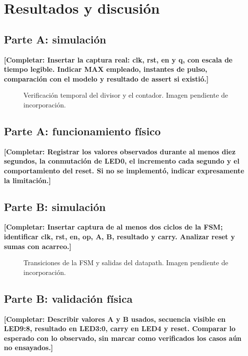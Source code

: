 \documentclass[conference]{IEEEtran}
\newcommand{\completar}[1]{\textcolor{pendiente}{\textbf{[Completar: #1]}}}
\begin{document}
\section{Resultados y discusión}
\subsection{Parte A: simulación}
\completar{Insertar la captura real: clk, rst, en y q, con escala de tiempo legible. Indicar MAX empleado, instantes de pulso, comparación con el modelo y resultado de assert si existió.}
\begin{figure}[!t]\centering
{}
\caption{Verificación temporal del divisor y el contador. Imagen pendiente de incorporación.}\label{fig:simA}
\end{figure}

\subsection{Parte A: funcionamiento físico}
\completar{Registrar los valores observados durante al menos diez segundos, la conmutación de LED0, el incremento cada segundo y el comportamiento del reset. Si no se implementó, indicar expresamente la limitación.}

\subsection{Parte B: simulación}
\completar{Insertar captura de al menos dos ciclos de la FSM; identificar clk, rst, en, op, A, B, resultado y carry. Analizar reset y sumas con acarreo.}
\begin{figure}[!t]\centering
{}
\caption{Transiciones de la FSM y salidas del datapath. Imagen pendiente de incorporación.}\label{fig:simB}
\end{figure}

\subsection{Parte B: validación física}
\completar{Describir valores A y B usados, secuencia visible en LED9:8, resultado en LED3:0, carry en LED4 y reset. Comparar lo esperado con lo observado, sin marcar como verificados los casos aún no ensayados.}
\end{document}
